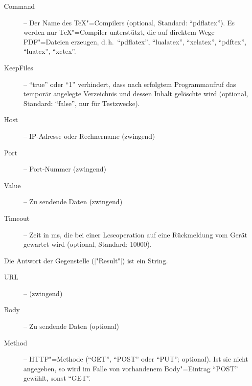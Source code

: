 \documentclass[titlepage=false,toc=nobibliography]{vl-report}
\newcommand*\action[1]{\fbox{\nolinkurl{#1}}\medskip\par}
\begin{document}
\begin{description}
\begin{description}
\begin{description}
        \item[Command] -- Der Name des \TeX"=Compilers (optional, Standard:
        "`pdflatex"'). Es werden nur \TeX"=Compiler unterstützt, die auf
        direktem Wege PDF"=Dateien erzeugen, d.\,h.\ "`pdflatex"',
        "`lualatex"', "`xelatex"', "`pdftex"', "`luatex"', "`xetex"'.

        \item[KeepFiles] -- "`true"' oder "`1"' verhindert, dass nach
        erfolgtem Programmaufruf das temporär angelegte Verzeichnis und
        dessen Inhalt gelöschte wird (optional, Standard: "`false"', nur für
        Testzwecke).

      \end{description}

    \item \action{TCP}

      \begin{description}

        \item[Host] -- IP-Adresse oder Rechnername (zwingend)

        \item[Port] -- Port-Nummer (zwingend)

        \item[Value] -- Zu sendende Daten (zwingend)

        \item[Timeout] -- Zeit in ms, die bei einer Leseoperation auf eine
        Rückmeldung vom Gerät gewartet wird (optional, Standard: 10000).

      \end{description}

      \noindent Die Antwort der Gegenstelle (|"Result"|) ist ein String.


    \item \action{HTTP}

      \begin{description}

        \item[URL] -- (zwingend)

        \item[Body] -- Zu sendende Daten (optional)

        \item[Method] -- HTTP"=Methode ("`GET"', "`POST"' oder "`PUT"';
        optional). Ist sie nicht angegeben, so wird im Falle von vorhandenem
        Body"=Eintrag "`POST"' gewählt, sonst "`GET"'.


\end{description}
\end{description}
\end{description}
\end{document}
